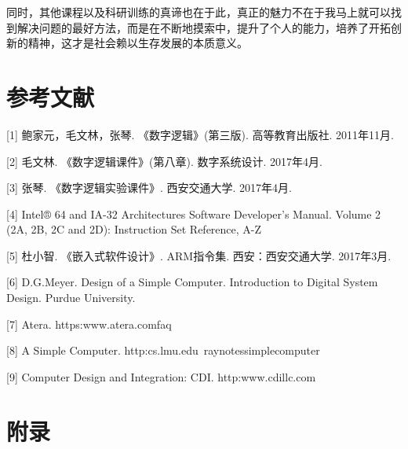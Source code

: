 \documentclass[UTF8]{ctexart}
\begin{document}
   	同时，其他课程以及科研训练的真谛也在于此，真正的魅力不在于我马上就可以找到解决问题的最好方法，而是在不断地摸索中，提升了个人的能力，培养了开拓创新的精神，这才是社会赖以生存发展的本质意义。
    \newpage

    \section{参考文献}
    [1] 鲍家元，毛文林，张琴. 《数字逻辑》(第三版). 高等教育出版社. 2011年11月.

    [2] 毛文林. 《数字逻辑课件》(第八章). 数字系统设计. 2017年4月.

    [3] 张琴. 《数字逻辑实验课件》. 西安交通大学. 2017年4月.

    [4] Intel® 64 and IA-32 Architectures Software Developer’s Manual. Volume 2 (2A, 2B, 2C and 2D): Instruction Set Reference, A-Z

    [5] 杜小智. 《嵌入式软件设计》. ARM指令集. 西安：西安交通大学. 2017年3月.

    [6] D.G.Meyer. Design of a Simple Computer. Introduction to Digital System Design. Purdue University.

    [7] Atera. https:\/\/www.atera.com\/faq

    [8] A Simple Computer. http:\/\/cs.lmu.edu\/~ray\/notes\/simplecomputer\/

    [9] Computer Design and Integration: CDI. http:\/\/www.cdillc.com\/
    \newpage

    \section{附录}
\end{document}
